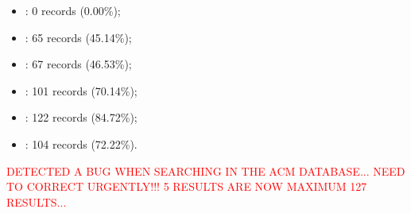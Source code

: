 \documentclass[10pt,a4paper,notitlepage,twocolumn,oneside]{article}
\begin{document}
\begin{itemize}\setlength\itemsep{-0.5em}
\item {}: 0 records (0.00\%);
\item {}: 65 records (45.14\%);
\item {}: 67 records (46.53\%);
\item {}: 101 records (70.14\%);
\item {}: 122 records (84.72\%);
\item {}: 104 records (72.22\%).
\end{itemize}

\textcolor{red}{DETECTED A BUG WHEN SEARCHING IN THE ACM DATABASE... NEED TO CORRECT URGENTLY!!! 5 RESULTS ARE NOW MAXIMUM 127 RESULTS...}
					
\end{document}
